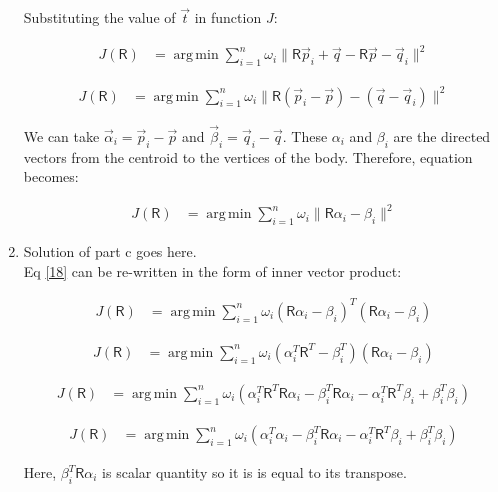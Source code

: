 \documentclass[a4paper, 11pt]{article}
\newcommand{\mat}[1]{\boldsymbol { \mathsf{#1}} }
\DeclareMathOperator*{\argmin}{arg\,min}
\newcommand{\norm}[1]{\lVert#1\rVert}
\begin{document}
\begin{enumerate}[label=\alph*.]
    Substituting the value of $\vec t$ in function $J$:
    
    \begin{align}
  J(\mat R) &= \argmin\sum_{i=1}^{n}\omega_i\norm{\mat R\vec p_i+ \vec q - \mat R \vec p -\vec q_i}^2
    \end{align}
    
    \begin{align}
  J(\mat R) &= \argmin\sum_{i=1}^{n}\omega_i\norm{\mat R (\vec p_i - \vec p) - (\vec q -\vec q_i)}^2
    \end{align}
    
    We can take $\vec \alpha_i = \vec p_i - \vec p$ and $\vec \beta_i = \vec q_i - \vec q$. These $\alpha_i$ and $\beta_i$ are the directed vectors from the centroid to the vertices of the body. Therefore, equation becomes:
    
    \begin{align}
  J(\mat R) &= \argmin\sum_{i=1}^{n}\omega_i\norm{\mat R \alpha_i - \beta_i}^2 \label{18}
    \end{align}
    
    \item
    Solution of part c goes here.\\
    
    Eq \eqref{18} can be re-written in the form of inner vector product:
    
    \begin{align}
  J(\mat R) &= \argmin\sum_{i=1}^{n}\omega_i (\mat R \alpha_i - \beta_i)^T(\mat R \alpha_i - \beta_i)
    \end{align}
    
    \begin{align}
  J(\mat R) &= \argmin\sum_{i=1}^{n}\omega_i (\alpha_i^T \mat R^T - \beta_i^T)(\mat R \alpha_i - \beta_i)
    \end{align}
    
    \begin{align}
  J(\mat R) &= \argmin\sum_{i=1}^{n}\omega_i (\alpha_i^T \mat R^T \mat R \alpha_i - \beta_i^T \mat R \alpha_i -  \alpha_i^T \mat R^T \beta_i + \beta_i^T \beta_i )
    \end{align}
    
    \begin{align}
  J(\mat R) &= \argmin\sum_{i=1}^{n}\omega_i (\alpha_i^T \alpha_i - \beta_i^T \mat R \alpha_i -  \alpha_i^T \mat R^T \beta_i + \beta_i^T \beta_i )\label{22}
    \end{align}
    
    Here, $\beta_i^T \mat R \alpha_i$ is scalar quantity so it is is equal to its transpose.
    

\end{enumerate}
\end{document}
